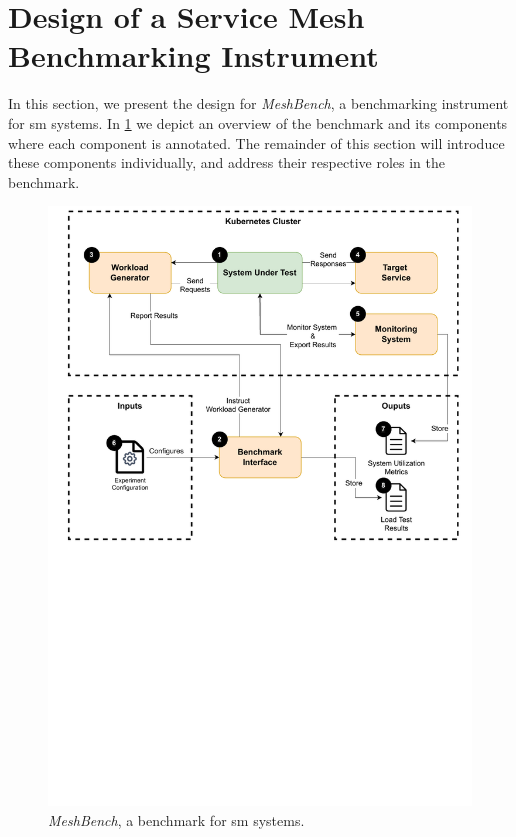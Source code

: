 \section{Design of a Service Mesh Benchmarking Instrument}
\label{sec:system:design}

In this section, we present the design for \textit{MeshBench}, a benchmarking instrument for \gls{sm} systems. In \cref{fig:benchmark-design} we depict an overview of the benchmark and its components where each component is annotated. The remainder of this section will introduce these components individually, and address their respective roles in the benchmark.



\begin{figure}[!t]
    \centering
    
     
    \includegraphics[width=0.9\linewidth]{4_system_design/figures/benchmark-design.pdf}
    
    \caption{\textit{MeshBench}, a benchmark for \gls{sm} systems.}
    
    \label{fig:benchmark-design}
\end{figure}



